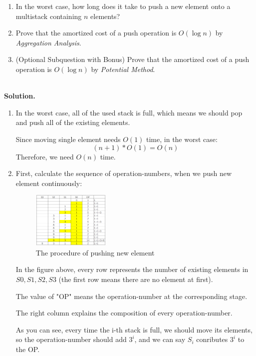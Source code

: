 \documentclass[12pt,a4paper]{article}
\theoremstyle{definition}
\begin{document}
\begin{enumerate}
    \begin{enumerate}
        \item In the worst case, how long does it take to push a new element onto a multistack containing $n$ elements?
        \item Prove that the amortized cost of a push operation is $O(\log n)$ by \emph{Aggregation Analysis}.
        \item {\color{red}(Optional Subquestion with Bonus)} Prove that the amortized cost of a push operation is $O(\log n)$ by \emph{Potential Method}.
    \end{enumerate}
	
	~\\
	\textbf{Solution.}
	
	\begin{enumerate}
		\item In the worst case, all of the used stack is full, which means we should pop and push all of the existing elements. 
		
		Since moving single element needs $O(1)$ time, in the worst case:  $$(n+1)*O(1)=O(n)$$
		Therefore, we need $O(n)$ time.
		\item First, calculate the sequence of operation-numbers, when we push new element continuously:
		\begin{figure}[!htbp]
			\centering
			\includegraphics[width=0.35\textwidth]{1.png}
			\caption{The procedure of pushing new element}
			\label{Fig-MultiStack}
		\end{figure}
	
		In the figure above, every row represents the number of  existing elements in $S0,S1,S2,S3$ (the first row means there are no element at first). 
		
		The value of "OP" means the operation-number at the corresponding stage.
		
		The right column explains the composition of every operation-number.
		
		As you can see, every time the i-th stack is full, we should move its elements, so the operation-number should add $3^i$, and we can say $S_i$ conributes $3^i$ to the OP.
		

\end{enumerate}
\end{enumerate}
\end{document}

